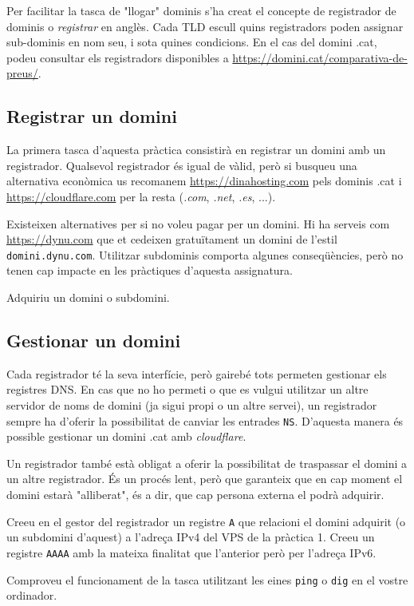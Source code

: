 \documentclass{practicaitic}
\begin{document}
Per facilitar la tasca de "llogar" dominis s'ha creat el concepte de
registrador de dominis o \textit{registrar} en anglès. Cada TLD escull quins
registradors poden assignar sub-dominis en nom seu, i sota quines condicions.
En el cas del domini .cat, podeu consultar els registradors disponibles a
\url{https://domini.cat/comparativa-de-preus/}.

\subsection{Registrar un domini}

La primera tasca d'aquesta pràctica consistirà en registrar un domini
amb un registrador. Qualsevol registrador és igual de vàlid, però si busqueu
una alternativa econòmica us recomanem \url{https://dinahosting.com} pels
dominis .cat i \url{https://cloudflare.com} per la resta (\textit{.com}, \textit{.net}, \textit{.es}, ...).

Existeixen alternatives per si no voleu pagar per un domini. Hi ha serveis com
\url{https://dynu.com} que et cedeixen gratuïtament un domini de l'estil
\texttt{domini.dynu.com}. Utilitzar subdominis comporta algunes conseqüències,
però no tenen cap impacte en les pràctiques d'aquesta assignatura.

\begin{tasca}
  Adquiriu un domini o subdomini.
\end{tasca}

\subsection{Gestionar un domini}

Cada registrador té la seva interfície, però gairebé tots permeten gestionar
els registres DNS. En cas que no ho permeti o que es vulgui utilitzar un altre
servidor de noms de domini (ja sigui propi o un altre servei), un registrador
sempre ha d'oferir la possibilitat de canviar les entrades \texttt{NS}. D'aquesta
manera és possible gestionar un domini .cat amb \textit{cloudflare}.

Un registrador també està obligat a oferir la possibilitat de traspassar el domini
a un altre registrador. És un procés lent, però que garanteix que en cap moment el
domini estarà "alliberat", és a dir, que cap persona externa el podrà adquirir.

\begin{tasca}
  Creeu en el gestor del registrador un registre \texttt{A} que relacioni
  el domini adquirit (o un subdomini d'aquest) a l'adreça IPv4 del VPS de la
  pràctica 1. Creeu un registre \texttt{AAAA} amb la mateixa finalitat que l'anterior
  però per l'adreça IPv6.

  Comproveu el funcionament de la tasca utilitzant les eines \texttt{ping}
  o \texttt{dig} en el vostre ordinador.
\end{tasca}
\end{document}
